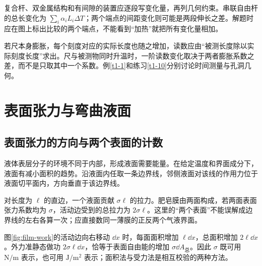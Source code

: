 复合杆、双金属结构和有间隙的装置应逐段写变化量，再列几何约束。串联自由杆的总长变化为 $\sum_i\alpha_iL_i\Delta T$；两个端点的间距变化则可能是两段伸长之差。解题时应在图上标出比较的两个端点，不能看到“加热”就把所有变化量相加。

若尺本身膨胀，每个刻度对应的实际长度也随之增加，读数应由“被测长度除以实际刻度长度”求出。尺与被测物同时升温时，一阶读数变化取决于两者膨胀系数之差，而不是只取其中一个系数。例\ref{t1-1}和练习\ref{t1-10}分别讨论时间测量与孔洞几何。

\section{表面张力与弯曲液面}
\subsection{表面张力的方向与两个表面的计数}
液体表层分子的环境不同于内部，形成液面需要能量。在给定温度和界面成分下，液面有减小面积的趋势。沿液面内任取一条边界线，邻侧液面对该线的作用力位于液面切平面内，方向垂直于该边界线。

对长度为 $\ell$ 的直边，一个液面贡献 $\sigma\ell$ 的拉力。肥皂膜由两面构成，若两面表面张力系数均为 $\sigma$，活动边受到的总拉力为 $2\sigma\ell$。这里的“两个表面”不能误解成边界线的左右各算一次；应直接数同一薄膜的正反两个气液界面。


图\ref{fig:film-work}的活动边向右移动 $\dd x$ 时，每面面积增加 $\ell\dd x$，总面积增加 $2\ell\dd x$。外力准静态做功 $2\sigma\ell\dd x$，恰等于表面自由能的增加 $\sigma\dd A_{\text{总}}$。因此 $\sigma$ 既可用 $\mathrm{N/m}$ 表示，也可用 $\mathrm{J/m^2}$ 表示；面积法与受力法是相互校验的两种方法。

